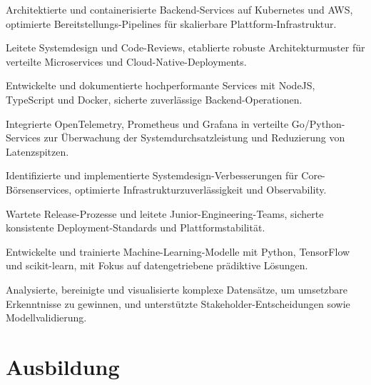 \documentclass[10pt,a4paper]{resume}
\begin{document}
\bullets
  \item Architektierte und containerisierte Backend-Services auf Kubernetes und AWS, optimierte Bereitstellungs-Pipelines für skalierbare Plattform-Infrastruktur.
  \item Leitete Systemdesign und Code-Reviews, etablierte robuste Architekturmuster für verteilte Microservices und Cloud-Native-Deployments.
  \item Entwickelte und dokumentierte hochperformante Services mit NodeJS, TypeScript und Docker, sicherte zuverlässige Backend-Operationen.
\bulletsend
\vspace{1.5pt}
\bullets
  \item Integrierte OpenTelemetry, Prometheus und Grafana in verteilte Go/Python-Services zur Überwachung der Systemdurchsatzleistung und Reduzierung von Latenzspitzen.
  \item Identifizierte und implementierte Systemdesign-Verbesserungen für Core-Börsenservices, optimierte Infrastrukturzuverlässigkeit und Observability.
  \item Wartete Release-Prozesse und leitete Junior-Engineering-Teams, sicherte konsistente Deployment-Standards und Plattformstabilität.
\bulletsend
\vspace{1.5pt}
\bullets
  \item Entwickelte und trainierte Machine-Learning-Modelle mit Python, TensorFlow und scikit-learn, mit Fokus auf datengetriebene prädiktive Lösungen.
  \item Analysierte, bereinigte und visualisierte komplexe Datensätze, um umsetzbare Erkenntnisse zu gewinnen, und unterstützte Stakeholder-Entscheidungen sowie Modellvalidierung.
\bulletsend
\vspace{1.5pt}

\section{Ausbildung}

\vspace{2pt}
\end{document}
